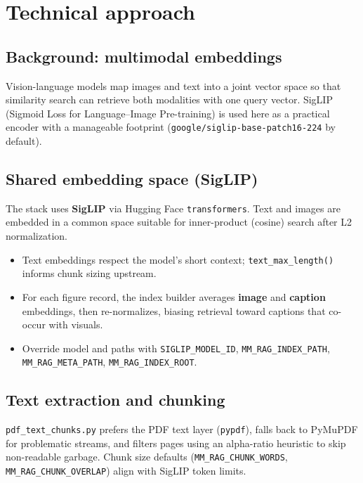 \documentclass[11pt]{article}
\begin{document}
\section{Technical approach}
\label{sec:technical}

\subsection{Background: multimodal embeddings}

Vision-language models map images and text into a joint vector space so that similarity search can retrieve both modalities with one query vector. SigLIP (Sigmoid Loss for Language--Image Pre-training) is used here as a practical encoder with a manageable footprint (\texttt{google/siglip-base-patch16-224} by default).

\subsection{Shared embedding space (SigLIP)}

The stack uses \textbf{SigLIP} via Hugging Face \texttt{transformers}. Text and images are embedded in a common space suitable for inner-product (cosine) search after L2 normalization.

\begin{itemize}
  \item Text embeddings respect the model's short context; \texttt{text\_max\_length()} informs chunk sizing upstream.
  \item For each figure record, the index builder averages \textbf{image} and \textbf{caption} embeddings, then re-normalizes, biasing retrieval toward captions that co-occur with visuals.
  \item Override model and paths with \texttt{SIGLIP\_MODEL\_ID}, \texttt{MM\_RAG\_INDEX\_PATH}, \texttt{MM\_RAG\_META\_PATH}, \texttt{MM\_RAG\_INDEX\_ROOT}.
\end{itemize}

\subsection{Text extraction and chunking}

\texttt{pdf\_text\_chunks.py} prefers the PDF text layer (\texttt{pypdf}), falls back to PyMuPDF for problematic streams, and filters pages using an alpha-ratio heuristic to skip non-readable garbage. Chunk size defaults (\texttt{MM\_RAG\_CHUNK\_WORDS}, \texttt{MM\_RAG\_CHUNK\_OVERLAP}) align with SigLIP token limits.
\end{document}
